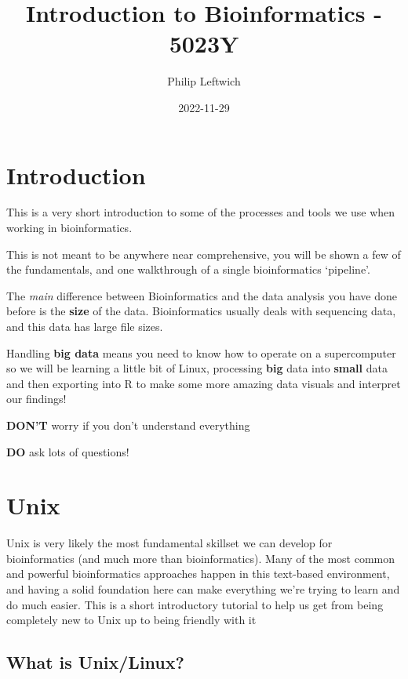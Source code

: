 \documentclass[
]{book}
\title{Introduction to Bioinformatics - 5023Y}
\author{Philip Leftwich}
\date{2022-11-29}
\begin{document}
\maketitle

{
\setcounter{tocdepth}{1}
\tableofcontents
}
\hypertarget{introduction}{%
\chapter{Introduction}\label{introduction}}

This is a very short introduction to some of the processes and tools we use when working in bioinformatics.

This is not meant to be anywhere near comprehensive, you will be shown a few of the fundamentals, and one walkthrough of a single bioinformatics `pipeline'.

The \emph{main} difference between Bioinformatics and the data analysis you have done before is the \textbf{size} of the data. Bioinformatics usually deals with sequencing data, and this data has large file sizes.

Handling \textbf{big data} means you need to know how to operate on a supercomputer so we will be learning a little bit of Linux, processing \textbf{big} data into \textbf{small} data and then exporting into R to make some more amazing data visuals and interpret our findings!

\textbf{DON'T} worry if you don't understand everything

\textbf{DO} ask lots of questions!

\hypertarget{Unix}{%
\chapter{Unix}\label{Unix}}

Unix is very likely the most fundamental skillset we can develop for bioinformatics (and much more than bioinformatics). Many of the most common and powerful bioinformatics approaches happen in this text-based environment, and having a solid foundation here can make everything we're trying to learn and do much easier. This is a short introductory tutorial to help us get from being completely new to Unix up to being friendly with it 🙂

\hypertarget{what-is-unixlinux}{%
\section{What is Unix/Linux?}\label{what-is-unixlinux}}
\end{document}
